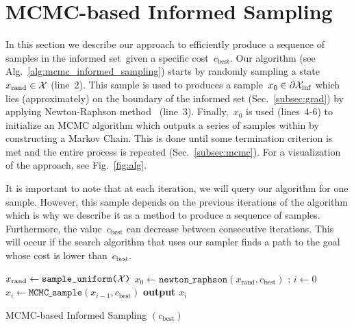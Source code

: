 \documentclass[letterpaper, 10 pt, conference]{ieeeconf}  %
\begin{document}
\section{MCMC-based Informed Sampling}
\label{sec:algorithm}

In this section we describe our approach to efficiently produce a sequence of samples in the informed set~\Cinf given a specific cost~$c_{\text{best}}$.
Our algorithm (see Alg.~\ref{alg:mcmc_informed_sampling}) starts by randomly sampling a state~$x_\text{rand} \in \mathcal{X}$ (line~2).
This sample is used to produces a 
sample~$x_0 \in \partial\mathcal{X}_{\rm {inf}}$ 
which lies (approximately) on the boundary of the informed set (Sec.~\ref{subsec:grad}) by applying Newton-Raphson method~\cite{RT06} (line~3).
Finally,~$x_0$ 
is used (lines~4-6)
to initialize an MCMC algorithm which outputs a series of samples within \Cinf by constructing a Markov Chain.
This is done until some termination criterion is met and the entire process is repeated (Sec.~\ref{subsec:mcmc}). 
For a visualization of the approach, see Fig.~\ref{fig:alg}.

It is important to note that at each iteration, we will query our algorithm for one sample. However, this sample depends on the previous iterations of the algorithm which is why we describe it as a method to produce a sequence of samples.
Furthermore, the value~$c_{\text{best}}$ can decrease between consecutive iterations.
This will occur if the search algorithm that uses our sampler finds a path to the goal whose cost is lower than~$c_{\text{best}}$.


\begin{algorithm}[t]
	\begin{algorithmic}[1]
		\LOOP
			\STATE $x_{\text{rand}} \leftarrow \texttt{sample\_uniform(\ensuremath{\mathcal{X}})}$
			\STATE $x_{0} 
		 \leftarrow
		 \texttt{newton\_raphson}(x_{\text{rand}}, c_{\text{best}})$ ; \hspace{3mm} $i\leftarrow 0$
			\STATE $x_{i} \leftarrow \texttt{MCMC\_sample} (x_{i-1}, c_{\text{best}})$
			\STATE \textbf{output} $x_{i}$
			\ENDWHILE
	
		\ENDLOOP 
%		 
   	\end{algorithmic}
	\caption{MCMC-based Informed Sampling $(c_{\text{best}})$}
	\label{alg:mcmc_informed_sampling}	
\end{algorithm}
\end{document}
